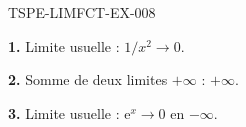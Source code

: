 \begin{corrige}{TSPE-LIMFCT-EX-008}

\textbf{1.} Limite usuelle : $1/x^2 \to \boxed{0}$.

\textbf{2.} Somme de deux limites $+\infty$ : $\boxed{+\infty}$.

\textbf{3.} Limite usuelle : $\mathrm{e}^x \to \boxed{0}$ en $-\infty$.

\end{corrige}
